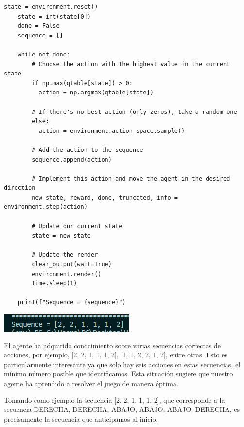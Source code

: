 \documentclass{article}
\begin{document}
\vspace{0.5cm}

\begin{lstlisting}[style=mystyle]
    state = environment.reset()
    state = int(state[0])
    done = False
    sequence = []
    
    while not done:
        # Choose the action with the highest value in the current state
        if np.max(qtable[state]) > 0:
          action = np.argmax(qtable[state])
    
        # If there's no best action (only zeros), take a random one
        else:
          action = environment.action_space.sample()
          
        # Add the action to the sequence
        sequence.append(action)
    
        # Implement this action and move the agent in the desired direction
        new_state, reward, done, truncated, info = environment.step(action)
    
        # Update our current state
        state = new_state
    
        # Update the render
        clear_output(wait=True)
        environment.render()
        time.sleep(1)
    
    print(f"Sequence = {sequence}")
\end{lstlisting}

\vspace{0.5cm}

\begin{center}
    \includegraphics[width=0.75\linewidth]{optimo.png}
\end{center}

\vspace{0.5cm}

El agente ha adquirido conocimiento sobre varias secuencias correctas de acciones, por ejemplo, [2, 2, 1, 1, 1, 2], [1, 1, 2, 2, 1, 2], entre otras. Esto es particularmente interesante ya que solo hay seis acciones en estas secuencias, el mínimo número posible que identificamos. Esta situación sugiere que nuestro agente ha aprendido a resolver el juego de manera óptima.

\vspace{0.5cm}

Tomando como ejemplo la secuencia [2, 2, 1, 1, 1, 2], que corresponde a la secuencia DERECHA, DERECHA, ABAJO, ABAJO, ABAJO, DERECHA, es precisamente la secuencia que anticipamos al inicio.
\end{document}
